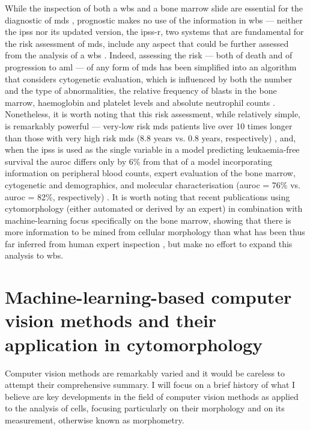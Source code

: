 While the inspection of both a \ac{wbs} and a bone marrow slide are essential for the diagnostic of \ac{mds} \cite{Greenberg2012-en,Arber2016-os}, prognostic makes no use of the information in \ac{wbs} --- neither the \ac{ipss} nor its updated version, the \ac{ipss-r}, two systems that are fundamental for the risk assessment of \ac{mds}, include any aspect that could be further assessed from the analysis of a \ac{wbs} \cite{Greenberg2012-en}. Indeed, assessing the risk --- both of death and of progression to \ac{aml} --- of any form of \ac{mds} has been simplified into an algorithm that considers cytogenetic evaluation, which is influenced by both the number and the type of abnormalities, the relative frequency of blasts in the bone marrow, haemoglobin and platelet levels and absolute neutrophil counts \cite{Greenberg2012-en}. Nonetheless, it is worth noting that this risk assessment, while relatively simple, is remarkably powerful --- very-low risk \ac{mds} patients live over 10 times longer than those with very high risk \ac{mds} (8.8 years vs. 0.8 years, respectively) \cite{Greenberg2012-en}, and, when the \ac{ipss} is used as the single variable in a model predicting leukaemia-free survival the \ac{auroc} differs only by 6\% from that of a model incorporating information on peripheral blood counts, expert evaluation of the bone marrow, cytogenetic and demographics, and molecular characterisation (\ac{auroc} = 76\% vs. \ac{auroc} = 82\%, respectively) \cite{Abelson2018}. It is worth noting that recent publications using cytomorphology (either automated or derived by an expert) in combination with machine-learning focus specifically on the bone marrow, showing that there is more information to be mined from cellular morphology than what has been thus far inferred from human expert inspection \cite{Bruck2021-fx,Nagata2020-lh}, but make no effort to expand this analysis to \ac{wbs}. 

\section{Machine-learning-based computer vision methods and their application in cytomorphology}

Computer vision methods are remarkably varied and it would be careless to attempt their comprehensive summary. I will focus on a brief history of what I believe are key developments in the field of computer vision methods as applied to the analysis of cells, focusing particularly on their morphology and on its measurement, otherwise known as morphometry.

